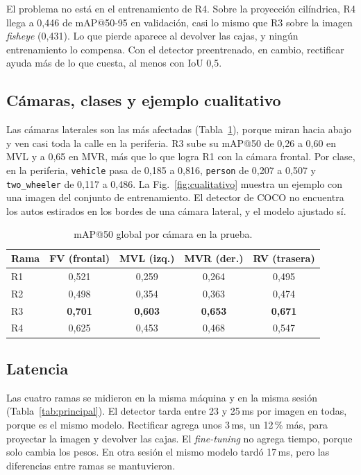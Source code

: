 \documentclass[conference]{IEEEtran}
\begin{document}
El problema no está en el entrenamiento de R4. Sobre la proyección cilíndrica, R4 llega a 0,446 de mAP@50-95 en validación, casi lo mismo que R3 sobre la imagen \textit{fisheye} (0,431). Lo que pierde aparece al devolver las cajas, y ningún entrenamiento lo compensa. Con el detector preentrenado, en cambio, rectificar ayuda más de lo que cuesta, al menos con IoU 0,5.

\subsection{Cámaras, clases y ejemplo cualitativo}
Las cámaras laterales son las más afectadas (Tabla~\ref{tab:camaras}), porque miran hacia abajo y ven casi toda la calle en la periferia. R3 sube su mAP@50 de 0,26 a 0,60 en MVL y a 0,65 en MVR, más que lo que logra R1 con la cámara frontal. Por clase, en la periferia, \texttt{vehicle} pasa de 0,185 a 0,816, \texttt{person} de 0,207 a 0,507 y \texttt{two\_wheeler} de 0,117 a 0,486. La Fig.~\ref{fig:cualitativo} muestra un ejemplo con una imagen del conjunto de entrenamiento. El detector de COCO no encuentra los autos estirados en los bordes de una cámara lateral, y el modelo ajustado sí.

\begin{table}[t]
\centering
\caption{mAP@50 global por cámara en la prueba.}
\label{tab:camaras}
\setlength{\tabcolsep}{5pt}
\begin{tabular}{@{}lcccc@{}}
\toprule
Rama & FV (frontal) & MVL (izq.) & MVR (der.) & RV (trasera) \\
\midrule
R1 & 0,521 & 0,259 & 0,264 & 0,495 \\
R2 & 0,498 & 0,354 & 0,363 & 0,474 \\
R3 & \textbf{0,701} & \textbf{0,603} & \textbf{0,653} & \textbf{0,671} \\
R4 & 0,625 & 0,453 & 0,468 & 0,547 \\
\bottomrule
\end{tabular}
\end{table}


\subsection{Latencia}
Las cuatro ramas se midieron en la misma máquina y en la misma sesión (Tabla~\ref{tab:principal}). El detector tarda entre 23 y 25\,ms por imagen en todas, porque es el mismo modelo. Rectificar agrega unos 3\,ms, un 12\,\% más, para proyectar la imagen y devolver las cajas. El \textit{fine-tuning} no agrega tiempo, porque solo cambia los pesos. En otra sesión el mismo modelo tardó 17\,ms, pero las diferencias entre ramas se mantuvieron.
\end{document}
